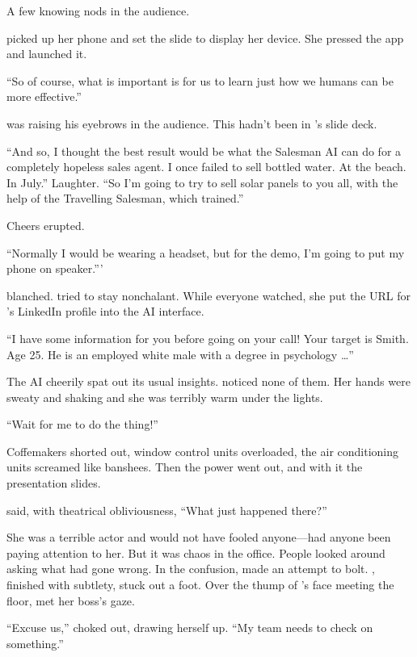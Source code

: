 A few knowing nods in the audience.

{\protag} picked up her phone and set the slide to display her device. She pressed the app and launched it.

``So of course, what is important is for us to learn just how we humans can be more effective.''

\Boss{} was raising his eyebrows in the audience. This hadn't been in {\protag}'s slide deck.

``And so, I thought the best result would be what the Salesman AI can do for a completely hopeless sales agent. I once failed to sell bottled water. At the beach. In July.'' Laughter. ``So I'm going to try to sell solar panels to you all, with the help of the Travelling Salesman, which \energyJerk{} trained.''

Cheers erupted.

``Normally I would be wearing a headset, but for the demo, I'm going to put my phone on speaker.'''

\energyJerk{} blanched. {\protag} tried to stay nonchalant. While everyone watched, she put the URL for \energyJerk{}'s LinkedIn profile into the AI interface.

``I have some information for you before going on your call! Your target is \energyJerk{} Smith. Age 25. He is an employed white male with a degree in psychology \dots''

The AI cheerily spat out its usual insights. {\protag} noticed none of them. Her hands were sweaty and shaking and she was terribly warm under the lights.

``Wait for me to do the thing!''

Coffemakers shorted out, window control units overloaded, the air conditioning units screamed like banshees. Then the power went out, and with it the presentation slides.

{\protag} said, with theatrical obliviousness, ``What just happened there?''

She was a terrible actor and would not have fooled anyone---had anyone been paying attention to her. But it was chaos in the office. People looked around asking what had gone wrong. In the confusion, \energyJerk{} made an attempt to bolt. {\protag}, finished with subtlety, stuck out a foot. Over the thump of \energyJerk{}'s face meeting the floor, {\protag} met her boss's gaze.

``Excuse us,'' \Boss{} choked out, drawing herself up. ``My team needs to check on something.''

